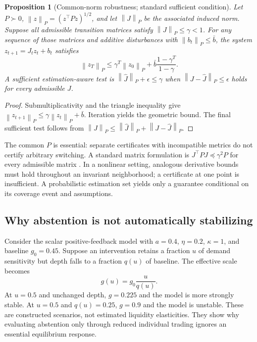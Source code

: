 \documentclass[11pt,a4paper]{article}
\newtheorem{proposition}[theorem]{Proposition}
\theoremstyle{definition}
\theoremstyle{remark}
\newcommand{\norm}[1]{\left\lVert #1\right\rVert}
\begin{document}
\begin{proposition}[Common-norm robustness; standard sufficient condition]
\label{prop:robust}
Let $P\succ0$, $\norm{z}_P=(z^\top Pz)^{1/2}$, and let $\norm{J}_P$ be the associated induced norm. Suppose all admissible transition matrices satisfy $\norm{J}_P\leq\gamma<1$. For any sequence of those matrices and additive disturbances with $\norm{b_t}_P\leq\bar b$, the system $z_{t+1}=J_tz_t+b_t$ satisfies
\begin{equation}
 \norm{z_T}_P\leq\gamma^T\norm{z_0}_P+
 \bar b\frac{1-\gamma^T}{1-\gamma}.
 \label{eq:robustbound}
\end{equation}
A sufficient estimation-aware test is $\norm{\widehat J}_P+\epsilon\leq\gamma$ when $\norm{J-\widehat J}_P\leq\epsilon$ holds for every admissible $J$.
\end{proposition}
\begin{proof}
Submultiplicativity and the triangle inequality give $\norm{z_{t+1}}_P\leq\gamma\norm{z_t}_P+\bar b$. Iteration yields the geometric bound. The final sufficient test follows from $\norm{J}_P\leq\norm{\widehat J}_P+\norm{J-\widehat J}_P$.
\end{proof}
The common $P$ is essential: separate certificates with incompatible metrics do not certify arbitrary switching. A standard matrix formulation is $J^\top PJ\preceq\gamma^2P$ for every admissible matrix \citep{boyd1994}. In a nonlinear setting, analogous derivative bounds must hold throughout an invariant neighborhood; a certificate at one point is insufficient. A probabilistic estimation set yields only a guarantee conditional on its coverage event and assumptions.

\subsection{Why abstention is not automatically stabilizing}
Consider the scalar positive-feedback model with $a=0.4$, $\eta=0.2$, $\kappa=1$, and baseline $g_0=0.45$. Suppose an intervention retains a fraction $u$ of demand sensitivity but depth falls to a fraction $q(u)$ of baseline. The effective scale becomes
\begin{equation}
 g(u)=g_0\frac{u}{q(u)}.
 \label{eq:gatedepth}
\end{equation}
At $u=0.5$ and unchanged depth, $g=0.225$ and the model is more strongly stable. At $u=0.5$ and $q(u)=0.25$, $g=0.9$ and the model is unstable. These are constructed scenarios, not estimated liquidity elasticities. They show why evaluating abstention only through reduced individual trading ignores an essential equilibrium response.
\end{document}
